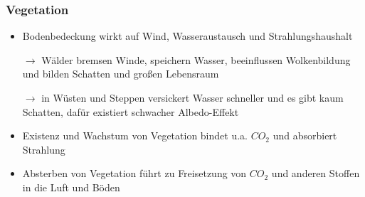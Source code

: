 \begin{frame}
	\frametitle{Vegetation}
		\begin{itemize}
			\item Bodenbedeckung wirkt auf Wind, Wasseraustausch und Strahlungshaushalt
			\item [$\rightarrow$] Wälder bremsen Winde, speichern Wasser, beeinflussen Wolkenbildung und bilden Schatten und großen Lebensraum
			\item [$\rightarrow$] in Wüsten und Steppen versickert Wasser schneller und es gibt kaum Schatten, dafür existiert schwacher Albedo-Effekt
			\item Existenz und Wachstum von Vegetation bindet u.a. $CO_2$ und absorbiert Strahlung
			\item Absterben von Vegetation führt zu Freisetzung von $CO_2$ und anderen Stoffen in die Luft und Böden %
		\end{itemize}

\end{frame}


